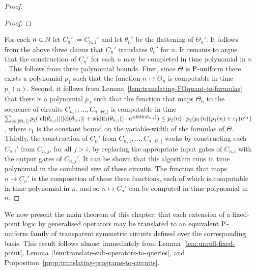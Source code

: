 \documentclass[../main/thesis.tex]{subfiles}
\begin{document}
\begin{proof}
\begin{proof}

\end{proof}

For each $n \in \mathbb{N}$ let $C_{n}' := C_{n, 1}'$ and let $\theta_n'$ be the
flattening of $\Theta_n'$. It follows from the above three claims that $C_n'$
translates $\theta_{n}'$ for $n$. It remains to argue that the construction of
$C_n'$ for each $n$ may be completed in time polynomial in $n$. This follows
from three polynomial bounds. First, since $\Theta$ is $\mathrm{P}$-uniform there
exists a polynomial $p_1$ such that the function $n \mapsto \Theta_n$ is
computable in time $p_1(n)$. Second, it follows from
Lemma~\ref{lem:translating-FOquant-to-formulas} that there is a polynomial $p_2$
such that the function that maps $\Theta_n$ to the sequence of circuits $C_{n,
  1}, \ldots, C_{n, \vert \Theta_n \vert}$ is computable in time $\sum_{i \in
  [\vert \Theta_n \vert]} p_2(\vert \mathrm{cl}(\theta_{n, i}) \vert (\vert
\mathrm{cl}(\theta_{n, i}) \vert + \mathrm{width}(\theta_{n, i})) \cdot n^{\mathrm{width}(\theta_{n,
      i})}) \leq p_2(n) \cdot p_2(p_1 (n) (p_1(n) + c_1) n^{c_1})$, where $c_1$
is the constant bound on the variable-width of the formulas of $\Theta$.
Thirdly, the construction of $C_n'$ from $C_{n, 1}, \ldots, C_{n, \vert \Theta_n
  \vert}$ works by constructing each $C_{n, i}'$ from $C_{n, j}$, for all $j >
i$, by replacing the appropriate input gates of $C_{n, i}$ with the output gates
of $C_{n, j}'$. It can be shown that this algorithm runs in time polynomial in
the combined size of these circuits. The function that maps $n \mapsto C_n'$ is
the composition of these three functions, each of which is computable in time
polynomial in $n$, and so $n \mapsto C_n'$ can be computed in time polynomial in
$n$.

  
\end{proof}
We now present the main theorem of this chapter: that each extension of a
fixed-point logic by generalised operators may be translated to an equivalent
$\mathrm{P}$-uniform family of transparent symmetric circuits defined over the
corresponding basis. This result follows almost immediately from
Lemma~\ref{lem:unroll-fixed-point},
Lemma~\ref{lem:translate-sub-operators-to-queries}, and
Proposition~\ref{prop:translating-programs-to-circuits}.
\end{document}
